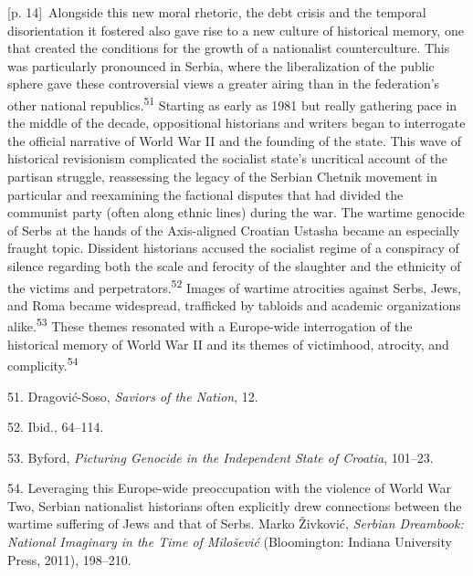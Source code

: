 \documentclass[10pt,a4paper]{article}
\begin{document}
{\scriptsize\color{gray} [p. 14]}\ Alongside this new moral rhetoric, the debt crisis and the temporal disorientation it fostered also gave rise to a new culture of historical memory, one that created the conditions for the growth of a nationalist counterculture. This was particularly pronounced in Serbia, where the liberalization of the public sphere gave these controversial views a greater airing than in the federation’s other national republics.\nobreak\textsuperscript{51} Starting as early as 1981 but really gathering pace in the middle of the decade, oppositional historians and writers began to interrogate the official narrative of World War II and the founding of the state. This wave of historical revisionism complicated the socialist state’s uncritical account of the partisan struggle, reassessing the legacy of the Serbian Chetnik movement in particular and reexamining the factional disputes that had divided the communist party (often along ethnic lines) during the war. The wartime genocide of Serbs at the hands of the Axis-aligned Croatian Ustasha became an especially fraught topic. Dissident historians accused the socialist regime of a conspiracy of silence regarding both the scale and ferocity of the slaughter and the ethnicity of the victims and perpetrators.\nobreak\textsuperscript{52} Images of wartime atrocities against Serbs, Jews, and Roma became widespread, trafficked by tabloids and academic organizations alike.\nobreak\textsuperscript{53} These themes resonated with a Europe-wide interrogation of the historical memory of World War II and its themes of victimhood, atrocity, and complicity.\nobreak\textsuperscript{54}\par{\small 51. Dragović-Soso, \textit{Saviors of the Nation}, 12.\par}{\small 52. Ibid., 64–114.\par}{\small 53. Byford, \textit{Picturing Genocide in the Independent State of Croatia}, 101–23.\par}{\small 54. Leveraging this Europe-wide preoccupation with the violence of World War Two, Serbian nationalist historians often explicitly drew connections between the wartime suffering of Jews and that of Serbs. Marko Živković, \textit{Serbian Dreambook: National Imaginary in the Time of Milošević} (Bloomington: Indiana University Press, 2011), 198–210.\par}
\end{document}
